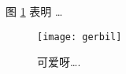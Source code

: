 \documentclass{article}
\begin{document}
图 \ref{fig:gerbil} 表明 \ldots

\begin{figure}
\centering
\texttt{[image: gerbil]}
\caption{\label{fig:gerbil}可爱呀\ldots.}
\end{figure}
\end{document}
